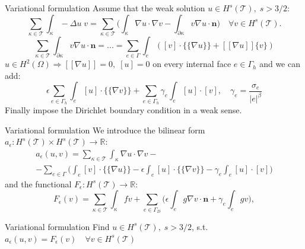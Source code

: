 \documentclass{beamer}
\begin{document}
\begin{frame}{Variational formulation}
	Assume that the weak solution $u \in H^s(\mathcal{T}), \; s>3/2$:
	\begin{equation*}
		\sum_{\kappa \in \mathcal{T}} \int_\kappa -\Delta u \; v
		= \sum_{\kappa \in \mathcal{T}} \bigg( \int_\kappa \nabla u \cdot
		\nabla v
		- \int_{\partial \kappa} v \nabla u \cdot \mathbf{n} \bigg) \quad
		\forall v
		\in H^s(\mathcal{T}).
	\end{equation*}
	\begin{equation*}
			\sum_{\kappa \in \mathcal{T}} \int_{\partial \kappa} v \nabla u
			\cdot \mathbf{n} = ... = \sum_{e \in \Gamma} \int_e ([v]
			\cdot
			\{\!\!\{
			\nabla u \}\!\!\}
			+ [\![
			\nabla u ]\!] \{v\} )
	\end{equation*}
	$u \in H^2(\Omega) \Rightarrow [\![\nabla u]\!] = 0, \; [u] =
	0$ on every internal face $e \in \Gamma_h$ and we can add:
	\begin{equation*}
		\epsilon \sum_{e \in \Gamma_h} \int_e [u] \cdot \{\!\!\{ \nabla v
		\}\!\!\} + \sum_{e \in \Gamma_h} \gamma_e \int_e [u] \cdot [v], \quad
		\gamma_e =
		\frac{\sigma_e}{|e|^\beta}
	\end{equation*}
	Finally impose the Dirichlet boundary condition in a weak sense.
\end{frame}
\begin{frame}{Variational formulation}
	We introduce the bilinear form
	$a_\epsilon: H^s(\mathcal{T}) \times H^s(\mathcal{T}) \rightarrow
	\mathbb{R}$:
	\begin{multline*}
	a_\epsilon(u, v) = \sum_{\kappa \in \mathcal{T}} \int_\kappa \nabla u \cdot
	\nabla v -\\
	-\sum_{e \in \Gamma} \bigg( \int_e [v] \cdot \{\!\!\{ \nabla u \}\!\!\}
	-\epsilon \int_e [u] \cdot \{\!\!\{ \nabla v \}\!\!\}
	- \gamma_e \int_e [u]\cdot[v] \bigg)
	\end{multline*}
	and the functional $F_\epsilon: H^s(\mathcal{T}) \rightarrow \mathbb{R}$:
	\begin{equation*}
	F_\epsilon(v) = \sum_{\kappa \in \mathcal{T}} \int_\kappa fv
	+ \sum_{e \in \Gamma_D} \bigg( \epsilon \int_e g \nabla v \cdot \mathbf{n}
	+ \gamma_e \int_e gv \bigg),
	\end{equation*}
	\begin{block}{Variational formulation}
	Find $u \in H^s(\mathcal{T}), \; s>3/2$, s.t. $a_\epsilon(u, v) =
	F_\epsilon(v) \quad \forall v \in H^s(\mathcal{T})$
	\end{block}

\end{frame}
\end{document}
